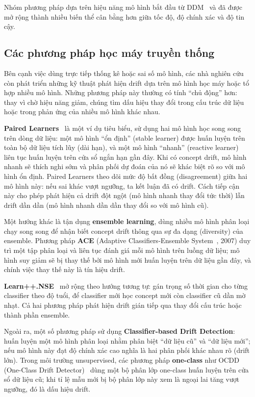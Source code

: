 Nhóm phương pháp dựa trên hiệu năng mô hình bắt đầu từ DDM~\cite{gama2004learning} và đã được mở rộng thành nhiều biến thể cân bằng hơn giữa tốc độ, độ chính xác và độ tin cậy.

\subsection{Các phương pháp học máy truyền thống}
Bên cạnh việc dùng trực tiếp thống kê hoặc sai số mô hình, các nhà nghiên cứu còn phát triển những kỹ thuật phát hiện drift dựa trên
mô hình học máy hoặc tổ hợp nhiều mô hình. Những phương pháp này thường có tính ``chủ động'' hơn: thay vì chờ hiệu năng giảm, chúng tìm
dấu hiệu thay đổi trong cấu trúc dữ liệu hoặc trong phản ứng của nhiều mô hình khác nhau.

\textbf{Paired Learners}~\cite{bach2008paired} là một ví dụ tiêu biểu, sử dụng hai mô hình học song song trên dòng dữ liệu: một mô
hình ``ổn định'' (stable learner) được huấn luyện trên toàn bộ dữ liệu tích lũy (dài hạn), và một mô hình ``nhanh'' (reactive learner) liên
tục huấn luyện trên cửa sổ ngắn hạn gần đây. Khi có concept drift, mô hình nhanh sẽ thích nghi sớm và phân phối dự đoán của nó sẽ khác
biệt rõ so với mô hình ổn định. Paired Learners theo dõi mức độ bất đồng (disagreement) giữa hai mô hình này: nếu sai khác vượt ngưỡng, ta
kết luận đã có drift. Cách tiếp cận này cho phép phát hiện cả drift đột ngột (mô hình nhanh thay đổi tức thời) lẫn drift dần dần (mô hình
nhanh dần dần thay đổi so với mô hình cũ).

Một hướng khác là tận dụng \textbf{ensemble learning}, dùng nhiều mô hình phân loại chạy song song để nhận biết concept drift thông qua sự đa dạng (diversity) của ensemble. Phương pháp \textbf{ACE} (Adaptive Classifiers-Ensemble System~\cite{nishida2007ace}, 2007) duy trì một tập phân loại và liên tục đánh giá mỗi mô hình trên luồng dữ liệu; mô hình suy giảm sẽ bị thay thế bởi mô hình mới huấn luyện trên dữ liệu gần đây, và chính việc thay thế này là tín hiệu drift.

\textbf{Learn++.NSE}~\cite{elwell2011learn} mở rộng theo hướng tương tự: gán trọng số thời gian cho từng classifier theo độ tuổi, để classifier mới học concept mới còn classifier cũ dần mờ nhạt. Cả hai phương pháp phát hiện drift gián tiếp qua thay đổi cấu trúc hoặc thành phần ensemble.

Ngoài ra, một số phương pháp sử dụng \textbf{Classifier-based Drift Detection}: huấn luyện một mô hình phân loại nhằm phân biệt ``dữ liệu cũ''
và ``dữ liệu mới''; nếu mô hình này đạt độ chính xác cao nghĩa là hai phân phối khác nhau rõ (drift lớn). Trong môi trường unsupervised, các
phương pháp \textbf{one-class} như OCDD (One-Class Drift Detector)~\cite{gozuacik2021ocdd} dùng một bộ phân lớp one-class huấn luyện trên cửa sổ dữ liệu cũ; khi tỉ lệ mẫu mới bị bộ phân lớp này xem là ngoại lai tăng vượt ngưỡng, đó là dấu hiệu drift.

